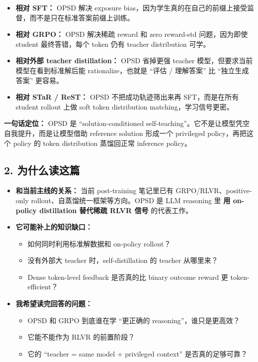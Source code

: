 \begin{itemize}[leftmargin=1.5em]
  \item \textbf{相对 SFT：} OPSD 解决 exposure bias，因为学生真的在自己的前缀上接受监督，而不是只在标准答案前缀上训练。
  \item \textbf{相对 GRPO：} OPSD 解决稀疏 reward 和 zero reward-std 问题，因为即使 student 最终答错，每个 token 仍有 teacher distribution 可学。
  \item \textbf{相对外部 teacher distillation：} OPSD 省掉更强 teacher 模型，但要求当前模型在看到标准解后能 rationalize，也就是 ``评估 / 理解答案'' 比 ``独立生成答案'' 更容易。
  \item \textbf{相对 STaR / ReST：} OPSD 不把成功轨迹筛出来再 SFT，而是在所有 student rollout 上做 soft token distribution matching，学习信号更密。
\end{itemize}

\begin{intubox}
\textbf{一句话定位：} OPSD 是 ``solution-conditioned self-teaching''。它不是让模型凭空自我提升，而是让模型借助 reference solution 形成一个 privileged policy，再把这个 policy 的 token distribution 蒸馏回正常 inference policy。
\end{intubox}

\subsection{2. 为什么读这篇}

\begin{itemize}[leftmargin=1.5em]
  \item \textbf{和当前主线的关系：} 当前 post-training 笔记里已有 GRPO/RLVR、positive-only rollout、自蒸馏统一框架等方向。OPSD 是 LLM reasoning 里 \textbf{用 on-policy distillation 替代稀疏 RLVR 信号} 的代表工作。
  \item \textbf{它可能补上的知识缺口：}
    \begin{itemize}[leftmargin=1.5em]
      \item 如何同时利用标准解数据和 on-policy rollout？
      \item 没有外部大 teacher 时，self-distillation 的 teacher 从哪里来？
      \item Dense token-level feedback 是否真的比 binary outcome reward 更 token-efficient？
    \end{itemize}
  \item \textbf{我希望读完回答的问题：}
    \begin{itemize}[leftmargin=1.5em]
      \item OPSD 和 GRPO 到底谁在学 ``更正确的 reasoning''，谁只是更高效？
      \item 它能不能作为 RLVR 的前置阶段？
      \item 它的 ``teacher = same model + privileged context'' 是否真的足够可靠？
    \end{itemize}
\end{itemize}

